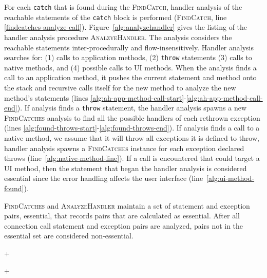 For each \lstinline!catch! that is found during the
\textsc{FindCatch}, handler analysis of the reachable statements of
the \lstinline!catch! block is performed (\textsc{FindCatch}, line
\ref{findcatches-analyze-call}).  Figure~\ref{alg:analyzehandler}
gives the listing of the handler analysis procedure
\textsc{AnalzyeHandler}. The analysis considers the reachable
statements inter-procedurally and flow-insens\-itively.  Handler
analysis searches for: (1) calls to application methods, (2)
\lstinline!throw! statements (3) calls to native methods, and (4)
possible calls to UI methods. When the analysis finds a call to an
application method, it pushes the current statement and method onto
the stack and recursive calls itself for the new method to analyze the
new method's statements (lines
\ref{alg:ah-app-method-call-start}-\ref{alg:ah-app-method-call-end}).
If analysis finds a \lstinline!throw!  statement, the handler analysis
spawns a new \textsc{FindCatches} analysis to find all the
possible handlers of each rethrown exception (lines
\ref{alg:found-throws-start}-\ref{alg:found-throws-end}).  If analysis
finds a call to a native method, we assume that it will throw all
exceptions it is defined to throw, handler analysis spawns a
\textsc{FindCatches} instance for each exception declared throws
(line~\ref{alg:native-method-line}).  If a call is encountered that
could target a UI method, then the statement that began the handler
analysis is considered essential since the error handling affects the
user interface (line~\ref{alg:ui-method-found}).

\textsc{FindCatches} and \textsc{AnalyzeHandler} maintain a set of
statement and exception pairs, essential, that records pairs that are
calculated as essential.  After all connection call statement and
exception pairs are analyzed, pairs not in the essential set are
considered non-essential.

\lstDeleteShortInline+

\lstMakeShortInline[basicstyle=\scriptsize\ttfamily,keywordstyle=\color{DarkPurple},breaklines=true]+

